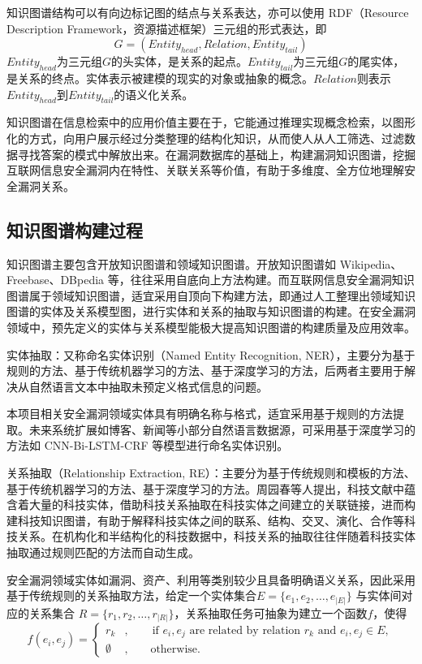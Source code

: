 \documentclass[a4paper,AutoFakeBold,oneside,12pt]{book}
\begin{document}
知识图谱结构可以有向边标记图的结点与关系表达，亦可以使用 RDF（Resource Description Framework，资源描述框架）三元组的形式表达，即
\begin{equation}
	G=(Entity_{head}, Relation, Entity_{tail})
\end{equation}
$Entity_{head}$为三元组$G$的头实体，是关系的起点。$Entity_{tail}$为三元组$G$的尾实体，是关系的终点。实体表示被建模的现实的对象或抽象的概念。$Relation$则表示$Entity_{head}$到$Entity_{tail}$的语义化关系。\cite{hogan_knowledge_2022}

知识图谱在信息检索中的应用价值主要在于，它能通过推理实现概念检索，以图形化的方式，向用户展示经过分类整理的结构化知识，从而使人从人工筛选、过滤数据寻找答案的模式中解放出来。在漏洞数据库的基础上，构建漏洞知识图谱，挖掘互联网信息安全漏洞内在特性、关联关系等价值，有助于多维度、全方位地理解安全漏洞关系。

\subsection{知识图谱构建过程}

知识图谱主要包含开放知识图谱和领域知识图谱。开放知识图谱如 Wikipedia、Freebase、DBpedia 等，往往采用自底向上方法构建。而互联网信息安全漏洞知识图谱属于领域知识图谱，适宜采用自顶向下构建方法，即通过人工整理出领域知识图谱的实体及关系模型图，进行实体和关系的抽取与知识图谱的构建。在安全漏洞领域中，预先定义的实体与关系模型能极大提高知识图谱的构建质量及应用效率。\cite{zhang_survey_2021}

实体抽取：又称命名实体识别（Named Entity Recognition, NER），主要分为基于规则的方法、基于传统机器学习的方法、基于深度学习的方法\cite{zhou_survey_2020}，后两者主要用于解决从自然语言文本中抽取未预定义格式信息的问题。

本项目相关安全漏洞领域实体具有明确名称与格式，适宜采用基于规则的方法提取。未来系统扩展如博客、新闻等小部分自然语言数据源，可采用基于深度学习的方法如 CNN-Bi-LSTM-CRF 等模型进行命名实体识别。

关系抽取（Relationship Extraction, RE）：主要分为基于传统规则和模板的方法、基于传统机器学习的方法、基于深度学习的方法。周园春等人提出，科技文献中蕴含着大量的科技实体，借助科技关系抽取在科技实体之间建立的关联链接，进而构建科技知识图谱，有助于解释科技实体之间的联系、结构、交叉、演化、合作等科技关系。在机构化和半结构化的科技数据中，科技关系的抽取往往伴随着科技实体抽取通过规则匹配的方法而自动生成。\cite{zhou_survey_2020}

安全漏洞领域实体如漏洞、资产、利用等类别较少且具备明确语义关系，因此采用基于传统规则的关系抽取方法，给定一个实体集合$E=\{e_1,e_2,\dots ,e_{|E|}\}$ 与实体间对应的关系集合 $R=\{r_1, r_2, \dots ,r_{|R|}\}$，关系抽取任务可抽象为建立一个函数$f$，使得
\begin{equation}
	\label{eq6}
	f(e_i, e_j)=\left\{
	\begin{aligned}
		r_k       & ,\qquad \text{if } e_i, e_j \text{ are related by relation } r_k \text{ and } e_i, e_j \in E, \\
		\emptyset & ,\qquad \text{otherwise.}
	\end{aligned}
	\right.
\end{equation}
\end{document}
